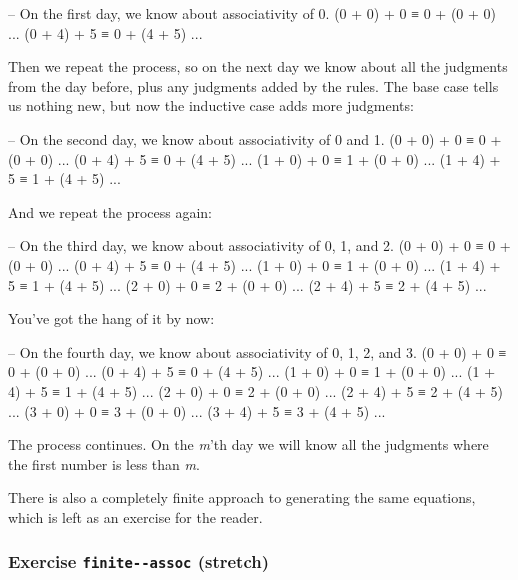 \begin{myDisplay}
-- On the first day, we know about associativity of 0.
(0 + 0) + 0 ≡ 0 + (0 + 0)   ...   (0 + 4) + 5 ≡ 0 + (4 + 5)   ...
\end{myDisplay}

Then we repeat the process, so on the next day we know about all the
judgments from the day before, plus any judgments added by the rules.
The base case tells us nothing new, but now the inductive case adds more
judgments:

\begin{myDisplay}
-- On the second day, we know about associativity of 0 and 1.
(0 + 0) + 0 ≡ 0 + (0 + 0)   ...   (0 + 4) + 5 ≡ 0 + (4 + 5)   ...
(1 + 0) + 0 ≡ 1 + (0 + 0)   ...   (1 + 4) + 5 ≡ 1 + (4 + 5)   ...
\end{myDisplay}

And we repeat the process again:

\begin{myDisplay}
-- On the third day, we know about associativity of 0, 1, and 2.
(0 + 0) + 0 ≡ 0 + (0 + 0)   ...   (0 + 4) + 5 ≡ 0 + (4 + 5)   ...
(1 + 0) + 0 ≡ 1 + (0 + 0)   ...   (1 + 4) + 5 ≡ 1 + (4 + 5)   ...
(2 + 0) + 0 ≡ 2 + (0 + 0)   ...   (2 + 4) + 5 ≡ 2 + (4 + 5)   ...
\end{myDisplay}

You've got the hang of it by now:

\begin{myDisplay}
-- On the fourth day, we know about associativity of 0, 1, 2, and 3.
(0 + 0) + 0 ≡ 0 + (0 + 0)   ...   (0 + 4) + 5 ≡ 0 + (4 + 5)   ...
(1 + 0) + 0 ≡ 1 + (0 + 0)   ...   (1 + 4) + 5 ≡ 1 + (4 + 5)   ...
(2 + 0) + 0 ≡ 2 + (0 + 0)   ...   (2 + 4) + 5 ≡ 2 + (4 + 5)   ...
(3 + 0) + 0 ≡ 3 + (0 + 0)   ...   (3 + 4) + 5 ≡ 3 + (4 + 5)   ...
\end{myDisplay}

The process continues. On the \emph{m}'th day we will know all the
judgments where the first number is less than \emph{m}.

There is also a completely finite approach to generating the same
equations, which is left as an exercise for the reader.

\hypertarget{Induction-finite-plus-assoc}{%
\subsubsection{\texorpdfstring{Exercise \texttt{finite-\textbar{}-assoc}
(stretch)}{Exercise finite-\textbar-assoc (stretch)}}\label{Induction-finite-plus-assoc}}

